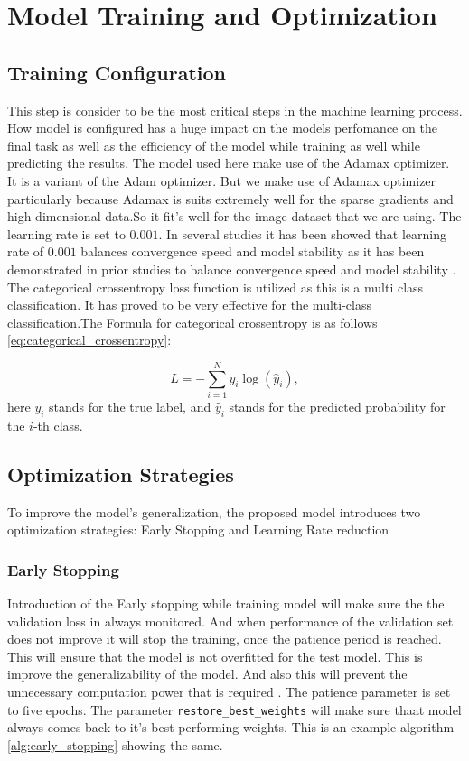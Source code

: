 \documentclass[12pt,onecolumn]{report}
\begin{document}
\section{Model Training and Optimization}

\subsection{Training Configuration}
This step is consider to be the most critical steps in the machine learning process. How model is configured has a huge impact on the models perfomance on the final task as well as the efficiency of the model while training as well while predicting the results. The model used here make use of the Adamax optimizer. It is a variant of the Adam optimizer. But we make use of Adamax optimizer particularly because Adamax is suits extremely well for the sparse gradients and high dimensional data.So it fit's well for the image dataset that we are using. The learning rate is set to \(0.001\). In several studies it has been showed that learning rate of \(0.001\) balances convergence speed and model stability as it has been demonstrated in prior studies to balance convergence speed and model stability \cite{2017Kingma}. The categorical crossentropy loss function is utilized as this is a multi class classification. It has proved to be very effective for the multi-class classification.The Formula for categorical crossentropy is as follows \ref{eq:categorical_crossentropy}:

\begin{equation}
    L = -\sum_{i=1}^{N} y_i \log(\hat{y}_i),
    \label{eq:categorical_crossentropy}
\end{equation}
here \(y_i\) stands for the true label, and \(\hat{y}_i\) stands for the predicted probability for the \(i\)-th class.

\subsection{Optimization Strategies}
To improve the model's generalization, the proposed model introduces two optimization strategies: Early Stopping and Learning Rate reduction

\subsubsection{Early Stopping}
Introduction of the Early stopping while training model will make sure the the validation loss in always monitored. And when performance of the validation set does not improve it will stop the training, once the patience period is reached. This will ensure that the model is not overfitted for the test model. This is improve the generalizability of the model. And also this will prevent the unnecessary computation power that is required \cite{1996Lutz}. The patience parameter is set to five epochs. The parameter \texttt{restore\_best\_weights} will make sure thaat model always comes back to it's best-performing weights. This is an example algorithm \ref{alg:early_stopping} showing the same.
\end{document}
